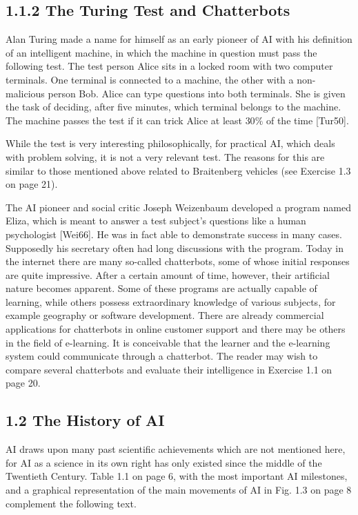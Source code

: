\documentclass[10pt]{book}
\begin{document}
\subsection*{1.1.2 The Turing Test and Chatterbots}
Alan Turing made a name for himself as an early pioneer of AI with his definition of an intelligent machine, in which the machine in question must pass the following test. The test person Alice sits in a locked room with two computer terminals. One terminal is connected to a machine, the other with a non-malicious person Bob. Alice can type questions into both terminals. She is given the task of deciding, after five minutes, which terminal belongs to the machine. The machine passes the test if it can trick Alice at least $30 \%$ of the time [Tur50].

While the test is very interesting philosophically, for practical AI, which deals with problem solving, it is not a very relevant test. The reasons for this are similar to those mentioned above related to Braitenberg vehicles (see Exercise 1.3 on page 21).

The AI pioneer and social critic Joseph Weizenbaum developed a program named Eliza, which is meant to answer a test subject's questions like a human psychologist [Wei66]. He was in fact able to demonstrate success in many cases. Supposedly his secretary often had long discussions with the program. Today in the internet there are many so-called chatterbots, some of whose initial responses are quite impressive. After a certain amount of time, however, their artificial nature becomes apparent. Some of these programs are actually capable of learning, while others possess extraordinary knowledge of various subjects, for example geography or software development. There are already commercial applications for chatterbots in online customer support and there may be others in the field of e-learning. It is conceivable that the learner and the e-learning system could communicate through a chatterbot. The reader may wish to compare several chatterbots and evaluate their intelligence in Exercise 1.1 on page 20.

\subsection*{1.2 The History of AI}
AI draws upon many past scientific achievements which are not mentioned here, for AI as a science in its own right has only existed since the middle of the Twentieth Century. Table 1.1 on page 6, with the most important AI milestones, and a graphical representation of the main movements of AI in Fig. 1.3 on page 8 complement the following text.
\end{document}
